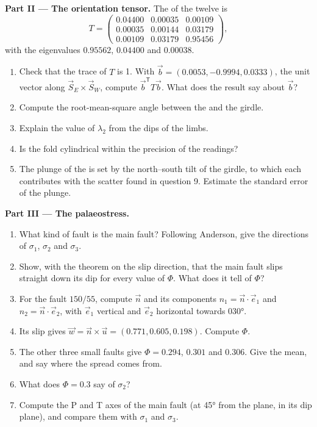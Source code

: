 \begin{problem}
\medskip\noindent\textbf{Part II --- The orientation tensor.}
The  of the twelve  is
\[
  T = \begin{pmatrix} 0.04400 & 0.00035 & 0.00109\\ 0.00035 & 0.00144 & 0.03179\\
  0.00109 & 0.03179 & 0.95456 \end{pmatrix},
\]
with the eigenvalues $0.95562$, $0.04400$ and $0.00038$.
\begin{enumerate}[resume]
  \item Check that the trace of $T$ is 1. With $\vec b = (0.0053, -0.9994,
        0.0333)$, the unit vector along $\vec S_E\times\vec S_W$, compute
        $\vec b^{\mathsf T}T\vec b$. What does the result say about $\vec b$?
  \item Compute the root-mean-square angle between the  and the girdle.
  \item Explain the value of $\lambda_2$ from the dips of the limbs.
  \item Is the fold cylindrical within the precision of the readings?
  \item The plunge of the  is set by the north--south tilt of the
        girdle, to which each  contributes with the scatter found in
        question 9. Estimate the standard error of the plunge.
\end{enumerate}

\medskip\noindent\textbf{Part III --- The palaeostress.}
\begin{enumerate}[resume]
  \item What kind of fault is the main fault? Following Anderson, give the
        directions of $\sigma_1$, $\sigma_2$ and $\sigma_3$.
  \item Show, with the theorem on the slip direction, that the main fault
        slips straight down its dip for every value of $\Phi$. What does it
        tell of $\Phi$?
  \item For the fault $150/55$, compute $\vec n$ and its components $n_1 =
        \vec n\cdot\vec e_1$ and $n_2 = \vec n\cdot\vec e_2$, with $\vec e_1$
        vertical and $\vec e_2$ horizontal towards \ang{030}.
  \item Its slip gives $\vec w = \vec n\times\vec u = (0.771, 0.605, 0.198)$.
        Compute $\Phi$.
  \item The other three small faults give $\Phi = 0.294$, $0.301$ and
        $0.306$. Give the mean, and say where the spread comes from.
  \item What does $\Phi = 0.3$ say of $\sigma_2$?
  \item Compute the P and T axes of the main fault (at \ang{45} from the
        plane, in its dip plane), and compare them with $\sigma_1$ and
        $\sigma_3$.
\end{enumerate}


\end{problem}
